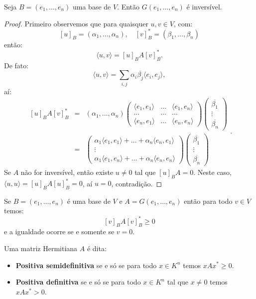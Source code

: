 \documentclass[11pt,twoside,a4paper]{book}
\begin{document}
\begin{proposicao}
Seja $B=(e_1,\dots,e_n)$ uma base de $V$. Então $G(e_1,\dots,e_n)$ é inversível.
\end{proposicao}
\begin{proof}
Primeiro observemos que para quaisquer $u,v\in V$, com:
\[
[u]_B=(\alpha_1,\dots,\alpha_n),\quad [v]_B^*=(\beta_1,\dots,\beta_n)
\]
então:
\[
\langle u,v\rangle=[u]_BA[v]_B^*.
\]
De fato:
\[
\langle u,v\rangle=\sum_{i,j}\alpha_i\overline{\beta_j}\langle e_i,e_j\rangle,
\]
aí:
\[
\begin{array}{rcl}
[u]_BA[v]_B^*&=&(\alpha_1,\dots,\alpha_n)\begin{pmatrix}
\langle e_1,e_1\rangle&\dots&\langle e_1,e_n\rangle\\\dots&\dots&\dots\\\langle e_n,e_1\rangle&\dots&\langle e_n,e_n\rangle
\end{pmatrix}\begin{pmatrix}
\overline{\beta_1}\\\vdots\\\overline{\beta_n}
\end{pmatrix}\\
&=&\begin{pmatrix}
\alpha_1\langle e_1,e_1\rangle+\dots+\alpha_n\langle e_n,e_1\rangle\\\vdots\\\alpha_1\langle e_1,e_n\rangle+\dots+\alpha_n\langle e_n,e_n\rangle
\end{pmatrix}\begin{pmatrix}
\overline{\beta_1}\\\vdots\\\overline{\beta_n}
\end{pmatrix}
\end{array}.
\]
Se $A$ não for inversível, então existe $u\neq 0$ tal que $[u]_BA=0$. Neste caso, $\langle u,u\rangle=[u]_BA[u]_B^*=0$, aí $u=0$, contradição.
\end{proof}

\noindent
Se $B=(e_1,\dots,e_n)$ é uma base de $V$ e $A=G(e_1,\dots,e_n)$ então para todo $v\in V$ temos:
\[
[v]_BA[v]_B^*\geq 0
\]
e a igualdade ocorre se e somente se $v=0$.

\begin{definicao}
Uma matriz Hermitiana $A$ é dita:
\begin{itemize}
\item \textbf{Positiva semidefinitiva} se e só se para todo $x\in K^n$ temos $xAx^*\geq 0$.
\item \textbf{Positiva definitiva} se e só se para todo $x\in K^n$ tal que $x\neq 0$ temos $xAx^*>0$.
\end{itemize}
\end{definicao}
\end{document}
